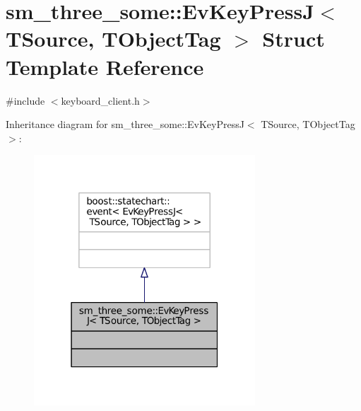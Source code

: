 \hypertarget{structsm__three__some_1_1EvKeyPressJ}{}\section{sm\+\_\+three\+\_\+some\+:\+:Ev\+Key\+PressJ$<$ T\+Source, T\+Object\+Tag $>$ Struct Template Reference}
\label{structsm__three__some_1_1EvKeyPressJ}


{\ttfamily \#include $<$keyboard\+\_\+client.\+h$>$}



Inheritance diagram for sm\+\_\+three\+\_\+some\+:\+:Ev\+Key\+PressJ$<$ T\+Source, T\+Object\+Tag $>$\+:
\nopagebreak
\begin{figure}[H]
\begin{center}
\leavevmode
\includegraphics[width=235pt]{structsm__three__some_1_1EvKeyPressJ__inherit__graph}
\end{center}
\end{figure}


